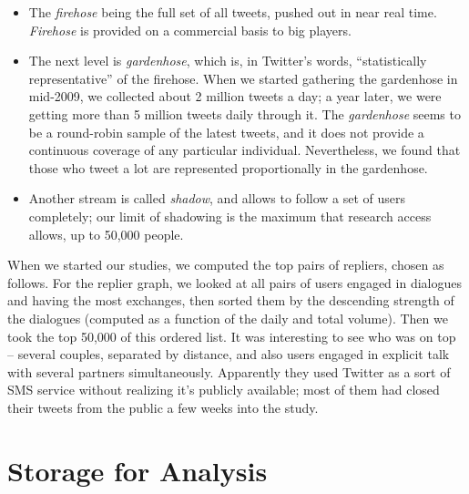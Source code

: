 \documentclass[10pt,oneside]{memoir}
\begin{document}
\begin{Spacing}{2}
\begin{itemize}


\item The {\itshape firehose} being the full set of all tweets, pushed out in near real time.  {\itshape Firehose} is provided on a commercial basis to big players.  




\item The next level is {\itshape gardenhose}, which is, in Twitter's words, ``statistically representative'' of the firehose.  When we started gathering the gardenhose in mid-2009, we collected about 2 million tweets a day; a year later, we were getting more than 5 million tweets daily through it.  The {\itshape gardenhose} seems to be a round-robin sample of the latest tweets, and it does not provide a continuous coverage of any particular individual.  Nevertheless, we found that those who tweet a lot are represented proportionally in the gardenhose.




\item Another stream is called {\itshape shadow}, and allows to follow a set of users completely; our limit of shadowing is the maximum that research access allows, up to 50,000 people.  



\end{itemize}

When we started our studies, we computed the top pairs of repliers, chosen as follows.  For the replier graph, we looked at all pairs of users engaged in dialogues and having the most exchanges, then sorted them by the descending strength of the dialogues (computed as a function of the daily and total volume).  Then we took the top 50,000 of this ordered list.  It was interesting to see who was on top -- several couples, separated by distance, and also users engaged in explicit talk with several partners simultaneously.  Apparently they used Twitter as a sort of SMS service without realizing it's publicly available; most of them had closed their tweets from the public a few weeks into the study.


\pagebreak \section{Storage for Analysis}
\label{storageforanalysis}


\end{Spacing}
\end{document}
